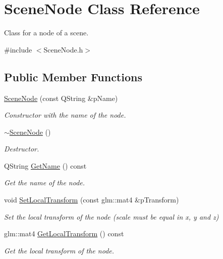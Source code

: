 \hypertarget{class_scene_node}{\section{Scene\+Node Class Reference}
\label{class_scene_node}
}


Class for a node of a scene.  




{\ttfamily \#include $<$Scene\+Node.\+h$>$}

\subsection*{Public Member Functions}
\begin{DoxyCompactItemize}
\item 
\hyperlink{class_scene_node_a7e696c70c3989a791353bd23e561d7b4}{Scene\+Node} (const Q\+String \&p\+Name)
\begin{DoxyCompactList}\small\item\em Constructor with the name of the node. \end{DoxyCompactList}\item 
\hyperlink{class_scene_node_a11be58b869975806f2ff5a627770fa2e}{$\sim$\+Scene\+Node} ()
\begin{DoxyCompactList}\small\item\em Destructor. \end{DoxyCompactList}\item 
Q\+String \hyperlink{class_scene_node_a994b622bd2dea04dc47e29e5c6c88c71}{Get\+Name} () const 
\begin{DoxyCompactList}\small\item\em Get the name of the node. \end{DoxyCompactList}\item 
void \hyperlink{class_scene_node_aad670030082043555020615148c017b3}{Set\+Local\+Transform} (const glm\+::mat4 \&p\+Transform)
\begin{DoxyCompactList}\small\item\em Set the local transform of the node (scale must be equal in x, y and z) \end{DoxyCompactList}\item 
glm\+::mat4 \hyperlink{class_scene_node_a38e85751e316c2ccb0447fac18c70edc}{Get\+Local\+Transform} () const 
\begin{DoxyCompactList}\small\item\em Get the local transform of the node. \end{DoxyCompactList}\item 

\end{DoxyCompactItemize}
